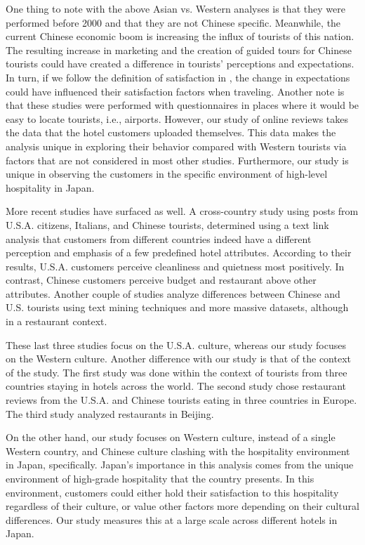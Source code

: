 \documentclass[smallextended,natbib]{svjour3}       %
\begin{document}
    One thing to note with the above Asian vs. Western analyses is that they were performed before 2000 and that they are not Chinese specific. Meanwhile, the current Chinese economic boom is increasing the influx of tourists of this nation. The resulting increase in marketing and the creation of guided tours for Chinese tourists could have created a difference in tourists' perceptions and expectations. In turn, if we follow the definition of satisfaction in \cite{hunt1975}, the change in expectations could have influenced their satisfaction factors when traveling. Another note is that these studies were performed with questionnaires in places where it would be easy to locate tourists, i.e., airports. However, our study of online reviews takes the data that the hotel customers uploaded themselves. This data makes the analysis unique in exploring their behavior compared with Western tourists via factors that are not considered in most other studies. Furthermore, our study is unique in observing the customers in the specific environment of high-level hospitality in Japan.

    More recent studies have surfaced as well. A cross-country study \cite[][]{FRANCESCO201924} using posts from U.S.A. citizens, Italians, and Chinese tourists, determined using a text link analysis that customers from different countries indeed have a different perception and emphasis of a few predefined hotel attributes. According to their results, U.S.A. customers perceive cleanliness and quietness most positively. In contrast, Chinese customers perceive budget and restaurant above other attributes. Another couple of studies \cite[][]{JIA2020104071, HUANG2017117} analyze differences between Chinese and U.S. tourists using text mining techniques and more massive datasets, although in a restaurant context. 

    These last three studies focus on the U.S.A. culture, whereas our study focuses on the Western culture. Another difference with our study is that of the context of the study. The first study \cite[][]{FRANCESCO201924} was done within the context of tourists from three countries staying in hotels across the world. The second study chose restaurant reviews from the U.S.A. and Chinese tourists eating in three countries in Europe. The third study analyzed restaurants in Beijing.

    On the other hand, our study focuses on Western culture, instead of a single Western country, and Chinese culture clashing with the hospitality environment in Japan, specifically. Japan's importance in this analysis comes from the unique environment of high-grade hospitality that the country presents. In this environment, customers could either hold their satisfaction to this hospitality regardless of their culture, or value other factors more depending on their cultural differences. Our study measures this at a large scale across different hotels in Japan.
\end{document}

